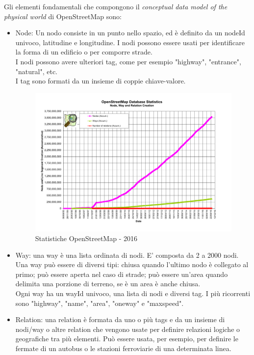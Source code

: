 \documentclass[12pt,a4paper,openright,twoside]{report}
\begin{document}
Gli elementi fondamentali che compongono il \textit{conceptual data model of the physical world} di OpenStreetMap sono:
\begin{itemize}
\item Node: Un nodo consiste in un punto nello spazio, ed è definito da un nodeId univoco, latitudine e longitudine. I nodi possono essere usati per identificare la forma di un edificio o per comporre strade.\\
I nodi possono avere ulteriori tag, come per esempio "highway", "entrance", "natural", etc.\\
I tag sono formati da un insieme di coppie chiave-valore. \\

\begin{figure}[h] 
\centering 
\includegraphics[scale=1]{fig3} 
\caption{Statistiche OpenStreetMap - 2016} 
\end{figure}
\item Way: una way è una lista ordinata di nodi. E' composta da 2 a 2000 nodi. Una way può essere di diversi tipi: chiusa quando l'ultimo nodo è collegato al primo; può essere aperta nel caso di strade; può essere un'area quando delimita una porzione di terreno, se è un area è anche chiusa.\\
Ogni way ha un wayId univoco, una lista di nodi e diversi tag. I più ricorrenti sono "highway", "name", "area", "oneway" e "maxspeed".
\item Relation: una relation è formata da uno o più tags e da un insieme di nodi/way o altre relation che vengono usate per definire relazioni logiche o geografiche tra più elementi. Può essere usata, per esempio, per definire le fermate di un autobus o le stazioni ferroviarie di una determinata linea.
\end{itemize}
\end{document}
